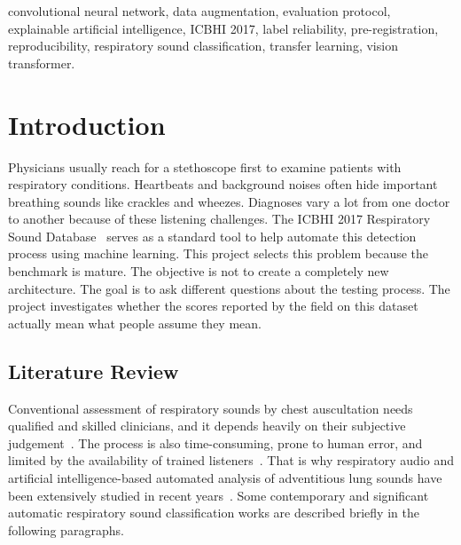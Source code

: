 \documentclass[journal,onecolumn]{IEEEtran}
\newif\ifshownew
\newcommand{\added}[1]{\ifshownew\ul{#1}\else#1\fi}
\begin{document}
\begin{IEEEkeywords}
convolutional neural network, data augmentation, evaluation protocol,
explainable artificial intelligence, ICBHI 2017, label reliability, pre-registration,
reproducibility, respiratory sound classification, transfer learning, vision transformer.
\end{IEEEkeywords}

\section{Introduction}
\label{sec:intro}

Physicians usually reach for a stethoscope first to examine patients with respiratory conditions. Heartbeats and background noises often hide important breathing sounds like crackles and wheezes. Diagnoses vary a lot from one doctor to another because of these listening challenges. The ICBHI 2017 Respiratory Sound Database~\cite{rocha2019icbhi} serves as a standard tool to help automate this detection process using machine learning. This project selects this problem because the benchmark is mature. The objective is not to create a completely new architecture. The goal is to ask different questions about the testing process. The project investigates whether the scores reported by the field on this dataset actually mean what people assume they mean.

\subsection{Literature Review}
\label{subsec:lit}

\added{Conventional assessment of respiratory sounds by chest auscultation needs qualified
and skilled clinicians, and it depends heavily on their subjective
judgement~\mbox{\cite{melbye2016kappa}}. The process is also time-consuming, prone to human
error, and limited by the availability of trained
listeners~\mbox{\cite{huang2024crackles,tzeng2025jmir}}. That is why respiratory audio and artificial
intelligence-based automated analysis of adventitious lung sounds have been extensively studied
in recent years~\mbox{\cite{electronics2025review}}. Some contemporary and significant automatic
respiratory sound classification works are described briefly in the following paragraphs.}
\end{document}
